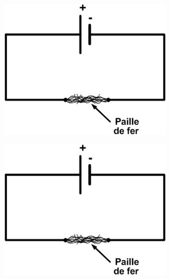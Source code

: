 \documentclass[12pt,a4paper]{article}
\begin{document}
\begin{multicols}{2}
\begin{center}
	\includegraphics[scale=0.45]{img/courtcircuit}
\end{center}

\begin{center}
	\includegraphics[scale=0.45]{img/courtcircuit}
\end{center}

\end{multicols}
\end{document}
